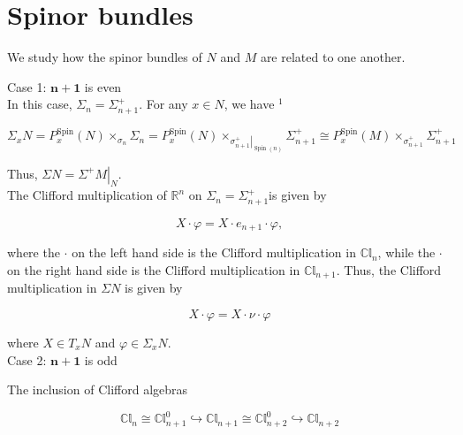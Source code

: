 \documentclass[10pt, letterpaper]{article}
\begin{document}
\pagebreak

\section{Spinor bundles}

We study how the spinor bundles of $N$ and $M$ are related to one another.

Case 1: $\mathbf{n}+\mathbf{1}$ is even\\
In this case, $\Sigma_{n}=\Sigma_{n+1}^{+}$. For any $x \in N$, we have ${ }^{1}$

$$
\Sigma_{x} N=P_{x}^{\operatorname{Spin}}(N) \times_{\sigma_{n}} \Sigma_{n}=P_{x}^{\operatorname{Spin}}(N) \times_{\left.\sigma_{n+1}^{+}\right|_{\operatorname{Spin}(n)}} \Sigma_{n+1}^{+} \cong P_{x}^{\operatorname{Spin}}(M) \times_{\sigma_{n+1}^{+}} \Sigma_{n+1}^{+}
$$

Thus, $\Sigma N=\left.\Sigma^{+} M\right|_{N}$.\\
The Clifford multiplication of $\mathbb{R}^{n}$ on $\Sigma_{n}=\Sigma_{n+1}^{+}$is given by

$$
X \cdot \varphi=X \cdot e_{n+1} \cdot \varphi,
$$

where the $\cdot$ on the left hand side is the Clifford multiplication in $\mathbb{C l}_{n}$, while the $\cdot$ on the right hand side is the Clifford multiplication in $\mathbb{C l}_{n+1}$. Thus, the Clifford multiplication in $\Sigma N$ is given by

$$
X \cdot \varphi=X \cdot \nu \cdot \varphi
$$

where $X \in T_{x} N$ and $\varphi \in \Sigma_{x} N$.\\
Case 2: $\mathbf{n}+\mathbf{1}$ is odd

The inclusion of Clifford algebras

$$
\mathbb{C l}_{n} \cong \mathbb{C l}_{n+1}^{0} \hookrightarrow \mathbb{C l}_{n+1} \cong \mathbb{C l}_{n+2}^{0} \hookrightarrow \mathbb{C l}_{n+2}
$$
\end{document}
